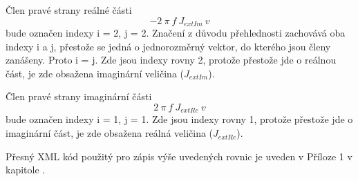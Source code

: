 \documentclass[12pt,a4paper,oneside]{article}
\numberwithin{equation}{section} %
\numberwithin{figure}{section} %
\numberwithin{table}{section} %
\begin{document}
Člen pravé strany reálné části
\begin{equation}
- 2 ~ \pi ~ f ~ J _{extIm} ~ v
\end{equation}
bude označen indexy i = 2, j = 2. Značení z důvodu přehlednosti zachovává oba indexy i a j, přestože se jedná o jednorozměrný vektor, do kterého jsou členy zanášeny. Proto i = j. Zde jsou indexy rovny 2, protože přestože jde o reálnou část, je zde obsažena imaginární veličina ($J _{extIm}$).

Člen pravé strany imaginární části
\begin{equation}
2 ~ \pi ~ f ~ J _{extRe} ~ v
\end{equation}
bude označen indexy i = 1, j = 1. Zde jsou indexy rovny 1, protože přestože jde o imaginární část, je zde obsažena reálná veličina ($J _{extRe}$).

Přesný XML kód použitý pro zápis výše uvedených rovnic je uveden v Příloze 1 v kapitole .
\end{document}
